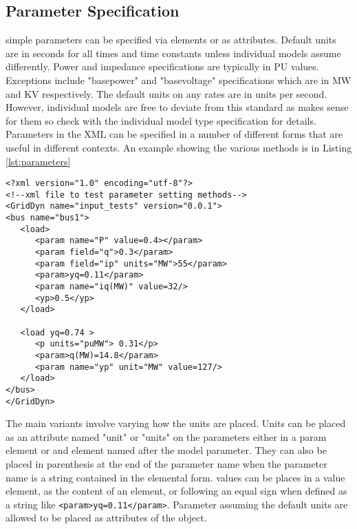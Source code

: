 \documentclass[12pt]{article} %
\begin{document}
\subsection{Parameter Specification}
simple parameters can be specified via elements or as attributes.  Default units are in seconds for all times and time constants unless individual models assume differently.  Power and impedance specifications are typically in PU values.  Exceptions include "basepower" and "basevoltage" specifications which are in MW and KV respectively. The default units on any rates are in units per second.  However, individual models are free to deviate from this standard as makes sense for them so check with the individual model type specification for details.  Parameters in the XML can be specified in a number of different forms that are useful in different contexts.  An example showing the various methods is in Listing \ref{lst:parameters}
\begin{lstlisting}[caption={XML file for testing parameter input methods},label={lst:parameters}]
<?xml version="1.0" encoding="utf-8"?>
<!--xml file to test parameter setting methods-->
<GridDyn name="input_tests" version="0.0.1">
<bus name="bus1">
   <load>
      <param name="P" value=0.4></param>
      <param field="q">0.3</param>
      <param field="ip" units="MW">55</param>
      <param>yq=0.11</param>
      <param name="iq(MW)" value=32/>
      <yp>0.5</yp>
   </load>

   <load yq=0.74 >
      <p units="puMW"> 0.31</p>
      <param>q(MW)=14.8</param>
      <param name="yp" unit="MW" value=127/>
   </load>
</bus>
</GridDyn>
\end{lstlisting}
The main variants involve varying how the units are placed.  Units can be placed as an attribute named "unit" or "units" on the parameters either in a param element or and element named after the model parameter.  They can also be placed in parenthesis at the end of the parameter name when the parameter name is a string contained in the elemental form.  values can be places in a value element, as the content of an element, or following an equal sign when defined as a string like  {\tt  <param>yq=0.11</param>}.  Parameter assuming the default units are allowed to be placed as attributes of the object.
\end{document}

